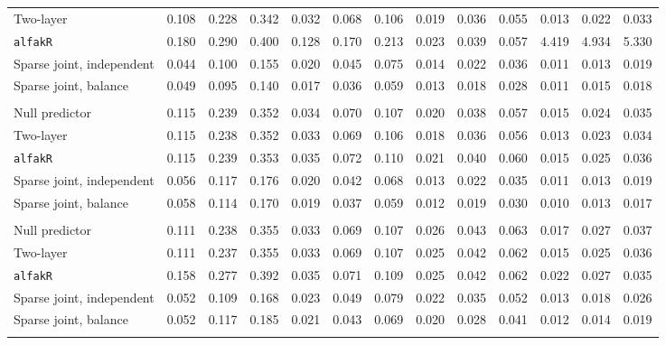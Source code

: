 \begin{center}
\begin{tabular}{l*{12}{r}}
\quad Two-layer & 0.108 & 0.228 & 0.342 & 0.032 & 0.068 & 0.106 & 0.019 & 0.036 & 0.055 & 0.013 & 0.022 & 0.033 \\
\quad \texttt{alfakR} & 0.180 & 0.290 & 0.400 & 0.128 & 0.170 & 0.213 & 0.023 & 0.039 & 0.057 & 4.419 & 4.934 & 5.330 \\
\quad Sparse joint, independent & 0.044 & 0.100 & 0.155 & 0.020 & 0.045 & 0.075 & 0.014 & 0.022 & 0.036 & 0.011 & 0.013 & 0.019 \\
\quad Sparse joint, balance & 0.049 & 0.095 & 0.140 & 0.017 & 0.036 & 0.059 & 0.013 & 0.018 & 0.028 & 0.011 & 0.015 & 0.018 \\
\addlinespace[2pt]
\multicolumn{13}{l}{\textit{500/700, 360 d}} \\
\quad Null predictor & 0.115 & 0.239 & 0.352 & 0.034 & 0.070 & 0.107 & 0.020 & 0.038 & 0.057 & 0.015 & 0.024 & 0.035 \\
\quad Two-layer & 0.115 & 0.238 & 0.352 & 0.033 & 0.069 & 0.106 & 0.018 & 0.036 & 0.056 & 0.013 & 0.023 & 0.034 \\
\quad \texttt{alfakR} & 0.115 & 0.239 & 0.353 & 0.035 & 0.072 & 0.110 & 0.021 & 0.040 & 0.060 & 0.015 & 0.025 & 0.036 \\
\quad Sparse joint, independent & 0.056 & 0.117 & 0.176 & 0.020 & 0.042 & 0.068 & 0.013 & 0.022 & 0.035 & 0.011 & 0.013 & 0.019 \\
\quad Sparse joint, balance & 0.058 & 0.114 & 0.170 & 0.019 & 0.037 & 0.059 & 0.012 & 0.019 & 0.030 & 0.010 & 0.013 & 0.017 \\
\addlinespace[2pt]
\multicolumn{13}{l}{\textit{500/700, 1080 d}} \\
\quad Null predictor & 0.111 & 0.238 & 0.355 & 0.033 & 0.069 & 0.107 & 0.026 & 0.043 & 0.063 & 0.017 & 0.027 & 0.037 \\
\quad Two-layer & 0.111 & 0.237 & 0.355 & 0.033 & 0.069 & 0.107 & 0.025 & 0.042 & 0.062 & 0.015 & 0.025 & 0.036 \\
\quad \texttt{alfakR} & 0.158 & 0.277 & 0.392 & 0.035 & 0.071 & 0.109 & 0.025 & 0.042 & 0.062 & 0.022 & 0.027 & 0.035 \\
\quad Sparse joint, independent & 0.052 & 0.109 & 0.168 & 0.023 & 0.049 & 0.079 & 0.022 & 0.035 & 0.052 & 0.013 & 0.018 & 0.026 \\
\quad Sparse joint, balance & 0.052 & 0.117 & 0.185 & 0.021 & 0.043 & 0.069 & 0.020 & 0.028 & 0.041 & 0.012 & 0.014 & 0.019 \\
\addlinespace[2pt]
\multicolumn{13}{l}{\textit{500/700, bottleneck}} \\

\end{tabular}
\end{center}
